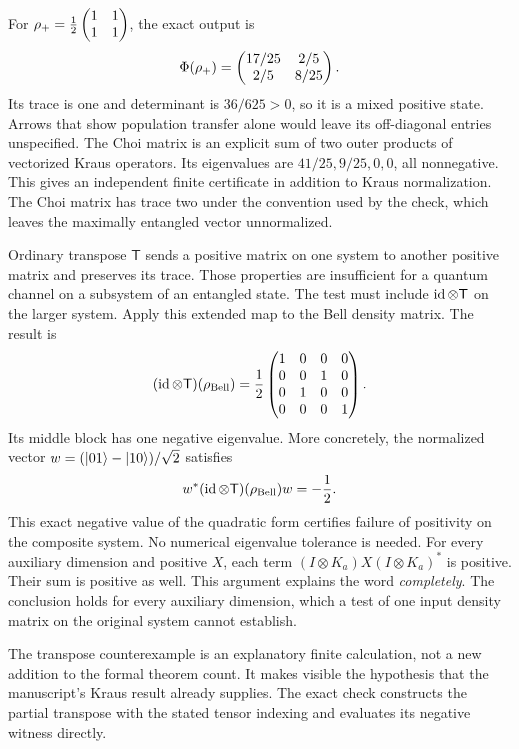 For $\rho_+=\frac12\begin{pmatrix}1&1\\1&1\end{pmatrix}$, the exact output is
\[
\Phi(\rho_+)=\begin{pmatrix}17/25&2/5\\2/5&8/25\end{pmatrix}.
\]
Its trace is one and determinant is $36/625>0$, so it is a mixed positive state. Arrows that show population transfer alone would leave its off-diagonal entries unspecified.
The Choi matrix is an explicit sum of two outer products of vectorized Kraus operators. Its eigenvalues are $41/25,9/25,0,0$, all nonnegative. This gives an independent finite certificate in addition to Kraus normalization. The Choi matrix has trace two under the convention used by the check, which leaves the maximally entangled vector unnormalized.

Ordinary transpose $\mathsf T$ sends a positive matrix on one system to another positive matrix and preserves its trace. Those properties are insufficient for a quantum channel on a subsystem of an entangled state. The test must include $\id\otimes\mathsf T$ on the larger system.
Apply this extended map to the Bell density matrix. The result is
\[
(\id\otimes\mathsf T)(\rho_{\rm Bell})
=\frac12\mat{1&0&0&0\\0&0&1&0\\0&1&0&0\\0&0&0&1}.
\]
Its middle block has one negative eigenvalue. More concretely, the normalized vector $w=(\lvert 01\rangle-\lvert 10\rangle)/\sqrt2$ satisfies
\[
w^*(\id\otimes\mathsf T)(\rho_{\rm Bell})w=-\frac12.
\]
This exact negative value of the quadratic form certifies failure of positivity on the composite system. No numerical eigenvalue tolerance is needed.
For every auxiliary dimension and positive $X$, each term $(I\otimes K_a)X(I\otimes K_a)^*$ is positive. Their sum is positive as well. This argument explains the word \emph{completely}. The conclusion holds for every auxiliary dimension, which a test of one input density matrix on the original system cannot establish.

The transpose counterexample is an explanatory finite calculation, not a new addition to the formal theorem count. It makes visible the hypothesis that the manuscript's Kraus result already supplies. The exact check constructs the partial transpose with the stated tensor indexing and evaluates its negative witness directly.

